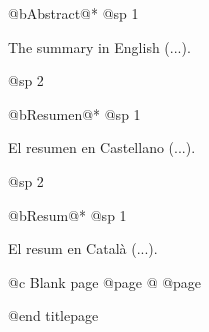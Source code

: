 @b{Abstract}@*
@sp 1

The summary in English (...).

@sp 2

@b{Resumen}@*
@sp 1

El resumen en Castellano (...).

@sp 2

@b{Resum}@*
@sp 1

El resum en Català (...).

@c Blank page
@page
@
@page

@end titlepage
